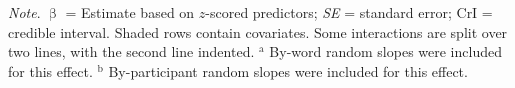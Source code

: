 \documentclass[
  12pt,
  man,floatsintext]{apa7}
\begin{document}
\begin{table}[!h]
\begin{threeparttable}
\begin{tabular}[t]{lrrrr}
\bottomrule
\end{tabular}
\begin{tablenotes}
\item \textit{\linebreak} 
\item \textit{Note}. $\upbeta$ = Estimate based on $z$-scored predictors; \textit{SE} = standard error; \linebreak \phantom{.}CrI = credible interval. Shaded rows contain covariates. Some interactions \linebreak \phantom{.}are split over two lines, with the second line indented. \linebreak \linebreak \phantom{.}$^{\text{a}}$ By-word random slopes were included for this effect. \linebreak \phantom{.}$^{\text{b}}$ By-participant random slopes were included for this effect.
\end{tablenotes}
\end{threeparttable}
\end{table}
\end{document}
